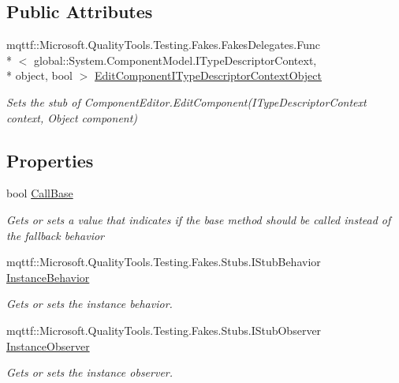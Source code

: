 \subsection*{Public Attributes}
\begin{DoxyCompactItemize}
\item 
mqttf\-::\-Microsoft.\-Quality\-Tools.\-Testing.\-Fakes.\-Fakes\-Delegates.\-Func\\*
$<$ global\-::\-System.\-Component\-Model.\-I\-Type\-Descriptor\-Context, \\*
object, bool $>$ \hyperlink{class_system_1_1_component_model_1_1_fakes_1_1_stub_component_editor_a1169bf893adb3fefb5bcc3bc9ca9a37c}{Edit\-Component\-I\-Type\-Descriptor\-Context\-Object}
\begin{DoxyCompactList}\small\item\em Sets the stub of Component\-Editor.\-Edit\-Component(\-I\-Type\-Descriptor\-Context context, Object component)\end{DoxyCompactList}\end{DoxyCompactItemize}
\subsection*{Properties}
\begin{DoxyCompactItemize}
\item 
bool \hyperlink{class_system_1_1_component_model_1_1_fakes_1_1_stub_component_editor_ad6bf02c28d20740cab9cb556ea4991ed}{Call\-Base}
\begin{DoxyCompactList}\small\item\em Gets or sets a value that indicates if the base method should be called instead of the fallback behavior\end{DoxyCompactList}\item 
mqttf\-::\-Microsoft.\-Quality\-Tools.\-Testing.\-Fakes.\-Stubs.\-I\-Stub\-Behavior \hyperlink{class_system_1_1_component_model_1_1_fakes_1_1_stub_component_editor_a486595374f699d2542defd11538ba933}{Instance\-Behavior}
\begin{DoxyCompactList}\small\item\em Gets or sets the instance behavior.\end{DoxyCompactList}\item 
mqttf\-::\-Microsoft.\-Quality\-Tools.\-Testing.\-Fakes.\-Stubs.\-I\-Stub\-Observer \hyperlink{class_system_1_1_component_model_1_1_fakes_1_1_stub_component_editor_ae1f66908292c6db27c2338c340090f94}{Instance\-Observer}
\begin{DoxyCompactList}\small\item\em Gets or sets the instance observer.\end{DoxyCompactList}\end{DoxyCompactItemize}


